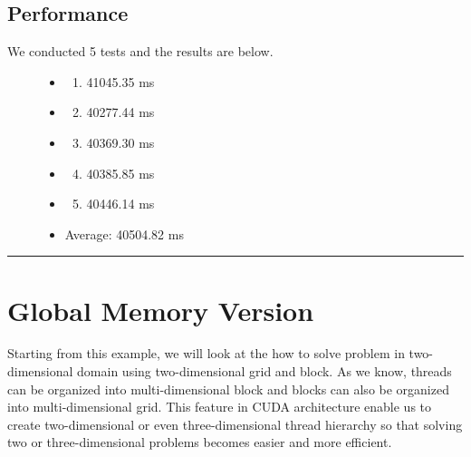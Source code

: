 \documentclass[letterpaper,10pt,openany,oneside]{sphinxmanual}
\begin{document}
\subsection{Performance}
\label{CUDA2D/CUDA2D:performance}\begin{description}
\item[{We conducted 5 tests and the results are below.}] \leavevmode\begin{itemize}
\item {} \begin{enumerate}
\item {} 
41045.35 ms

\end{enumerate}

\item {} \begin{enumerate}
\setcounter{enumi}{1}
\item {} 
40277.44 ms

\end{enumerate}

\item {} \begin{enumerate}
\setcounter{enumi}{2}
\item {} 
40369.30 ms

\end{enumerate}

\item {} \begin{enumerate}
\setcounter{enumi}{3}
\item {} 
40385.85 ms

\end{enumerate}

\item {} \begin{enumerate}
\setcounter{enumi}{4}
\item {} 
40446.14 ms

\end{enumerate}

\item {} 
Average: 40504.82 ms

\end{itemize}

\end{description}


\bigskip\hrule{}\bigskip



\section{Global Memory Version}
\label{CUDA2D/CUDA2D:global-memory-version}
Starting from this example, we will look at the how to solve problem in two-dimensional domain using two-dimensional grid and block. As we know, threads can be organized into multi-dimensional block and blocks can also be organized into multi-dimensional grid. This feature in CUDA architecture enable us to create two-dimensional or even three-dimensional thread hierarchy so that solving two or three-dimensional problems becomes easier and more efficient.
\end{document}
